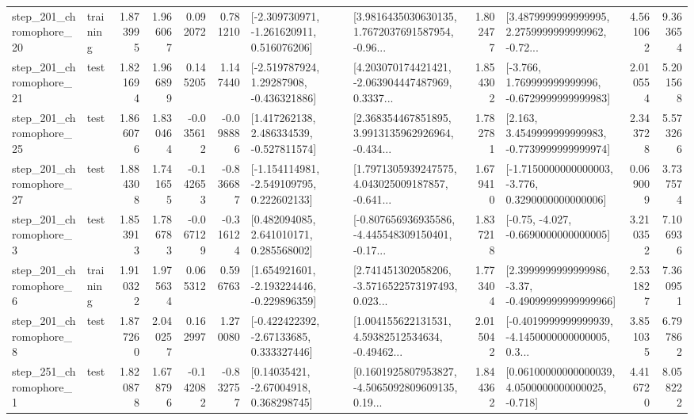 \begin{tabular}{llrrrrllrlrr}
  step\_201\_chromophore\_20 &  training &      1.873995 &    1.966067 &      0.092072 &  0.781210 &   [-2.309730971, -1.261620911, 0.516076206] &  [3.9816435030630135, 1.7672037691587954, -0.96... &       1.802477 &  [3.4879999999999995, 2.2759999999999962, -0.72... &            4.561062 &          9.363654 \\
  step\_201\_chromophore\_21 &      test &      1.821694 &    1.966899 &      0.145205 &  1.147440 &    [-2.519787924, 1.29287908, -0.436321886] &  [4.203070174421421, -2.063904447487969, 0.3337... &       1.854302 &   [-3.766, 1.769999999999996, -0.6729999999999983] &            2.010554 &          5.201568 \\
  step\_201\_chromophore\_25 &      test &      1.866076 &    1.830464 &     -0.035612 & -0.098886 &    [1.417262138, 2.486334539, -0.527811574] &  [2.368354467851895, 3.9913135962926964, -0.434... &       1.782781 &   [2.163, 3.4549999999999983, -0.7739999999999974] &            2.343728 &          5.573266 \\
  step\_201\_chromophore\_27 &      test &      1.884308 &    1.741655 &     -0.142653 & -0.836687 &   [-1.154114981, -2.549109795, 0.222602133] &  [1.7971305939247575, 4.043025009187857, -0.641... &       1.679410 &  [-1.7150000000000003, -3.776, 0.3290000000000006] &            0.069009 &          3.737574 \\
   step\_201\_chromophore\_3 &      test &      1.853913 &    1.786783 &     -0.067129 & -0.316124 &     [0.482094085, 2.641010171, 0.285568002] &  [-0.807656936935586, -4.445548309150401, -0.17... &       1.837218 &               [-0.75, -4.027, -0.6690000000000005] &            3.210352 &          7.106936 \\
   step\_201\_chromophore\_6 &  training &      1.910322 &    1.975634 &      0.065312 &  0.596763 &   [1.654921601, -2.193224446, -0.229896359] &  [2.741451302058206, -3.5716522573197493, 0.023... &       1.773404 &  [2.3999999999999986, -3.37, -0.49099999999999966] &            2.531827 &          7.360951 \\
   step\_201\_chromophore\_8 &      test &      1.877260 &    2.040257 &      0.162997 &  1.270080 &    [-0.422422392, -2.67133685, 0.333327446] &  [1.004155622131531, 4.59382512534634, -0.49462... &       2.015042 &  [-0.4019999999999939, -4.1450000000000005, 0.3... &            3.851035 &          6.797862 \\
   step\_251\_chromophore\_1 &      test &      1.820878 &    1.678796 &     -0.142082 & -0.832757 &      [0.14035421, -2.67004918, 0.368298745] &  [0.1601925807953827, -4.5065092809609135, 0.19... &       1.844362 &  [0.06100000000000039, 4.0500000000000025, -0.718] &            4.416720 &          8.058222 \\

\end{tabular}
